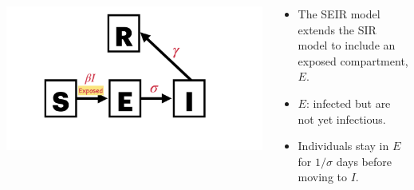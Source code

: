 \documentclass[
  ignorenonframetext,
]{beamer}
\providecommand{\tightlist}{%
  \setlength{\itemsep}{0pt}\setlength{\parskip}{0pt}}\usepackage{longtable,booktabs,array}
\begin{document}
\begin{frame}
\begin{columns}[T]
\begin{column}{0.5\textwidth}
\includegraphics{images/model_diagrams/model_diagrams.007.jpeg}
\end{column}

\begin{column}{0.5\textwidth}
\begin{itemize}
\tightlist
\item
  The SEIR model extends the SIR model to include an exposed
  compartment, {\(E\)}.
\item
  {\(E\)}: infected but are not yet infectious.
\item
  Individuals stay in {\(E\)} for {\(1/\sigma\)} days before moving to
  \(I\).
\end{itemize}
\end{column}
\end{columns}
\end{frame}
\end{document}
